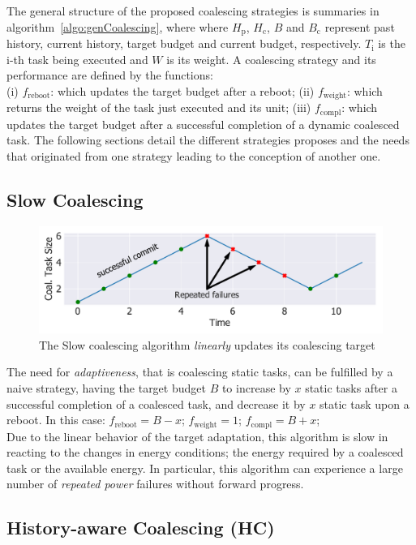 The general structure of the proposed coalescing strategies is summaries in algorithm~\ref{algo:genCoalescing}, where where $H_\text{p}$, $H_\text{c}$, $B$ and $B_\text{c}$ represent past history, current history, target budget and current budget, respectively. $T_\text{i}$ is the i-th task being executed and $W$ is its weight.
A coalescing strategy and its performance are defined by the functions: \\
(i) \emph{$f_\text{reboot}$}: which updates the target budget after a reboot; (ii) \emph{$f_\text{weight}$}: which returns the weight of the task just executed and its unit; (iii) \emph{$f_\text{compl}$}: which updates the target budget after a successful completion of a dynamic coalesced task. The following sections detail the different strategies \sys proposes and the needs that originated from one strategy leading to the conception of another one.

\subsection{Slow Coalescing}
\label{subsec:slowCoalescing}

\begin{figure}
	\centering
	\includegraphics[width=\columnwidth]{figures/slowCoal}%
	\caption{The Slow coalescing algorithm \emph{linearly} updates its coalescing target}
	\label{fig:slowCoal}
\end{figure}

The need for \emph{adaptiveness}, that is coalescing static tasks, can be fulfilled by a naive strategy, having the target budget $B$ to increase by $x$ static tasks after a successful completion of a coalesced task, and decrease it by $x$ static task upon a reboot. In this case: $f_\text{reboot} = B - x$; $f_\text{weight} =  1$; $f_\text{compl} = B + x$; \\
Due to the linear behavior of the target adaptation, this algorithm is slow in reacting to the changes in energy conditions; the energy required by a coalesced task or the available energy. In particular, this algorithm can experience a large number of \emph{repeated power} failures without forward progress.

\subsection{History-aware Coalescing (HC)}
\label{subsec:hCCoalescing}